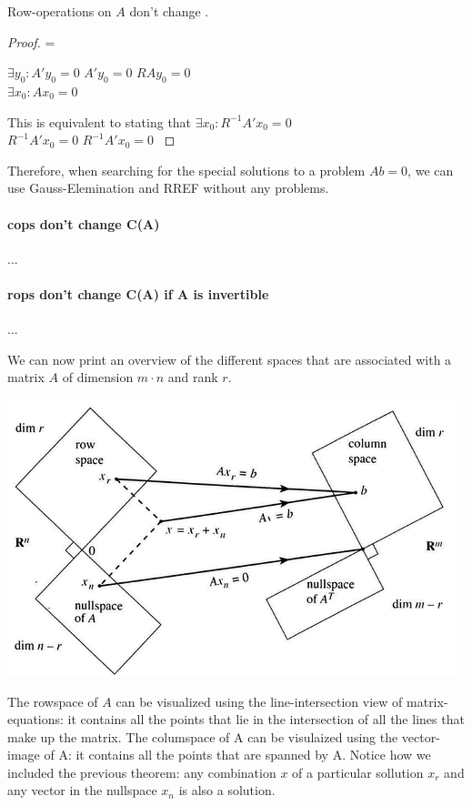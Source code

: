 \begin{theorem}
  Row-operations on $A$ don't change . 
\end{theorem}

\begin{proof}
     { = } {
         {$\exists y_0: A'y_0 = 0$} {
             {$A'y_0 = 0$} {
                $RAy_0 = 0$
            }
        } \\
         {$\exists x_0: Ax_0 = 0$} {
            This is equivalent to stating that $\exists x_0: R^{-1} A' x_0 = 0$ \\
             {$R^{-1} A' x_0 = 0$} {
                $R^{-1} A' x_0 = 0$
            }
            
        }
    } 
\end{proof}

Therefore, when searching for the special solutions to a problem $Ab = 0$, we can use Gauss-Elemination and RREF without any problems.

\paragraph{cops don't change C(A)} ...

\paragraph{rops don't change C(A) if A is invertible }...

We can now print an overview of the different spaces that are associated with a matrix $A$ of dimension $m \cdot n$ and rank $r$.

\includegraphics[width=0.7\linewidth]{images/four_spaces.png}

The rowspace of $A$ can be visualized using the line-intersection view of matrix-equations: it contains all the points that lie in the intersection of all the lines that make up the matrix. The columspace of A can be visulaized using the vector-image of A: it contains all the points that are spanned by A. 
Notice how we included the previous theorem: any combination $x$ of a particular sollution $x_r$ and any vector in the nullspace $x_n$ is also a solution.













